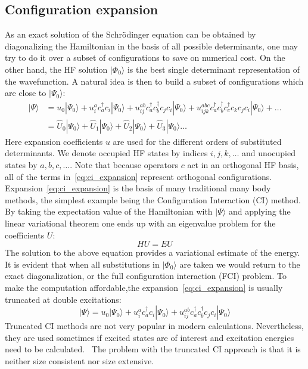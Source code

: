\subsection{Configuration expansion}
As an exact solution of the Schr{\"o}dinger equation can be obtained by 
diagonalizing the Hamiltonian in the basis of all possible determinants, one 
may try to do it over a subset of configurations to save on numerical cost. 
On the other hand, the HF solution $|\Phi_{0}\rangle$ is the best single 
determinant representation of the wavefunction. A natural idea is then to build 
a subset of configurations which are close to $|\Psi_{0}\rangle$:
%
\begin{equation}
\begin{aligned}
 |\Psi \rangle &= u_{0} |\Psi_{0}\rangle + u_{i}^{a} 
c^{\dagger}_{a} c_{i} |\Psi_{0}\rangle + u_{ij}^{ab} c^{\dagger}_{a} 
c^{\dagger}_{b} c_{j} c_{i} |\Psi_{0}\rangle + u_{ijk}^{abc} 
c^{\dagger}_{a} c^{\dagger}_{b} c^{\dagger}_{c} c_{k} c_{j} c_{i} 
|\Psi_{0}\rangle + \ldots \\
 &= \hat{U}_{0} |\Psi_{0}\rangle + \hat{U}_{1} |\Psi_{0}\rangle + \hat{U}_{2} 
|\Psi_{0}\rangle + \hat{U}_{3} 
|\Psi_{0}\rangle \ldots
\end{aligned}
\label{eq:ci_expansion}
\end{equation}
%
Here expansion coefficients $u$ are used for the different orders of 
substituted determinants. We denote occupied HF states by indices 
$i,j,k,\ldots$ and unocupied states by $a,b,c,\ldots$. Note that because 
operators $c$ act in an orthogonal HF basis, all of the terms 
in~\ref{eq:ci_expansion} represent orthogonal configurations. 
Expansion~\ref{eq:ci_expansion} is the basis of many traditional many body 
methods, the simplest example being the Configuration Interaction (CI) method. 
By taking the expectation value of the Hamiltonian with $|\Psi\rangle$ 
and applying the linear variational theorem one ends up with an eigenvalue 
problem for the coefficients $U$:
%
\begin{equation}
 HU = EU
 \label{eq:ci_eigenvalue}
\end{equation}
%
The solution to the above equation provides a variational estimate of 
the energy. It is evident that when all substitutions in $|\Phi_{0}\rangle$ are 
taken we would return to the exact diagonalization, or the full 
configuration interaction (FCI) problem. To make the computation affordable,the 
expansion~\ref{eq:ci_expansion} is usually truncated at double excitations:
%
\begin{equation}
 |\Psi \rangle = u_{0} |\Psi_{0}\rangle + u_{i}^{a} 
c^{\dagger}_{a} c_{i} |\Psi_{0}\rangle + u_{ij}^{ab} c^{\dagger}_{a} 
c^{\dagger}_{b} c_{j} c_{i} |\Psi_{0}\rangle
\end{equation}
%
Truncated CI methods are not very popular in modern calculations. 
Nevertheless, they are used sometimes if excited states are of interest 
and excitation energies need to be 
calculated.~\cite{sherrill1999configuration,head1994doubles}
The problem with the truncated CI approach is that it is neither size 
consistent nor size extensive.~\cite{helgaker2014molecular, 
jensen2017introduction} 


